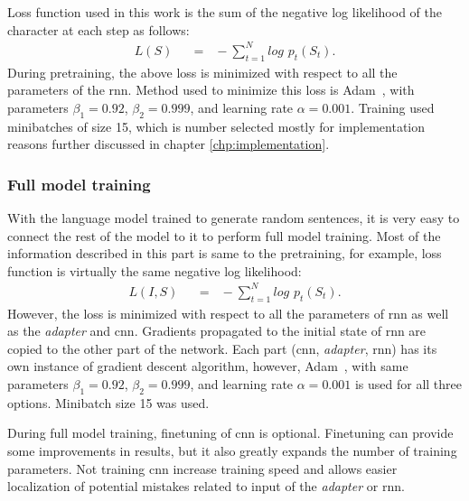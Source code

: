 Loss function used in this work is the sum of the negative log likelihood of the character at each step as follows:
\begin{align}
L(S) \hspace{7pt}&=\hspace{7pt} -\sum\limits_{t=1}^N log\hspace{4pt}p_t(S_t).  \label{eq:loss1}
\end{align}
During pretraining, the above loss is minimized with respect to all the parameters of the \gls{rnn}. Method used to minimize this loss is Adam~\cite{DBLP:journals/corr/KingmaB14}, with parameters $ \beta_1 = 0.92 $, $ \beta_2 = 0.999 $, and learning rate $ \alpha = 0.001 $. Training used minibatches of size 15, which is number selected mostly for implementation reasons further discussed in chapter \ref{chp:implementation}.

\subsubsection{Full model training}

With the language model trained to generate random sentences, it is very easy to connect the rest of the model to it to perform full model training. Most of the information described in this part is same to the pretraining, for example, loss function is virtually the same negative log likelihood:
\begin{align}
L(I,S) \hspace{7pt}&=\hspace{7pt} -\sum\limits_{t=1}^N log\hspace{4pt}p_t(S_t).  \label{eq:loss2}
\end{align}
However, the loss is minimized with respect to all the parameters of \gls{rnn} as well as the \emph{adapter} and \gls{cnn}. Gradients propagated to the initial state of \gls{rnn} are copied to the other part of the network. Each part (\gls{cnn}, \emph{adapter}, \gls{rnn}) has its own instance of gradient descent algorithm, however, Adam~\cite{DBLP:journals/corr/KingmaB14}, with same parameters $ \beta_1 = 0.92 $, $ \beta_2 = 0.999 $, and learning rate $ \alpha = 0.001 $ is used for all three options. Minibatch size 15 was used.

During full model training, finetuning of \gls{cnn} is optional. Finetuning can provide some improvements in results, but it also greatly expands the number of training parameters. Not training \gls{cnn} increase training speed and allows easier localization of potential mistakes related to input of the \emph{adapter} or \gls{rnn}.

